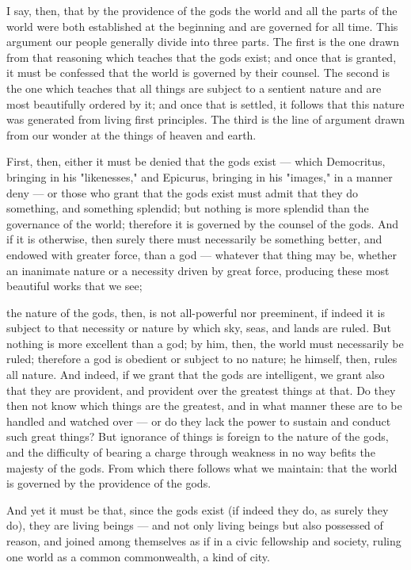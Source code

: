 I say, then, that by the providence of the gods the world and all the parts of the world were both established at the beginning and are governed for all time. This argument our people generally divide into three parts. The first is the one drawn from that reasoning which teaches that the gods exist; and once that is granted, it must be confessed that the world is governed by their counsel. The second is the one which teaches that all things are subject to a sentient nature and are most beautifully ordered by it; and once that is settled, it follows that this nature was generated from living first principles. The third is the line of argument drawn from our wonder at the things of heaven and earth.

 First, then, either it must be denied that the gods exist --- which Democritus, bringing in his "likenesses," and Epicurus, bringing in his "images," in a manner deny --- or those who grant that the gods exist must admit that they do something, and something splendid; but nothing is more splendid than the governance of the world; therefore it is governed by the counsel of the gods. And if it is otherwise, then surely there must necessarily be something better, and endowed with greater force, than a god --- whatever that thing may be, whether an inanimate nature or a necessity driven by great force, producing these most beautiful works that we see;

 the nature of the gods, then, is not all-powerful nor preeminent, if indeed it is subject to that necessity or nature by which sky, seas, and lands are ruled. But nothing is more excellent than a god; by him, then, the world must necessarily be ruled; therefore a god is obedient or subject to no nature; he himself, then, rules all nature. And indeed, if we grant that the gods are intelligent, we grant also that they are provident, and provident over the greatest things at that. Do they then not know which things are the greatest, and in what manner these are to be handled and watched over --- or do they lack the power to sustain and conduct such great things? But ignorance of things is foreign to the nature of the gods, and the difficulty of bearing a charge through weakness in no way befits the majesty of the gods. From which there follows what we maintain: that the world is governed by the providence of the gods.

 And yet it must be that, since the gods exist (if indeed they do, as surely they do), they are living beings --- and not only living beings but also possessed of reason, and joined among themselves as if in a civic fellowship and society, ruling one world as a common commonwealth, a kind of city.

